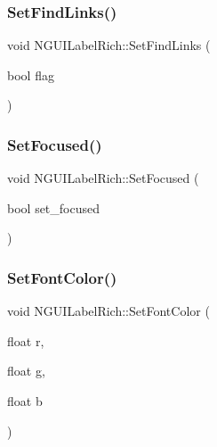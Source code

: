 \hypertarget{class_n_g_u_i_label_rich_a4e90829a193b725164089554447eec05}{}\label{class_n_g_u_i_label_rich_a4e90829a193b725164089554447eec05} 
\subsubsection{\texorpdfstring{Set\+Find\+Links()}{SetFindLinks()}}
{\footnotesize\ttfamily void N\+G\+U\+I\+Label\+Rich\+::\+Set\+Find\+Links (\begin{DoxyParamCaption}\item[{bool}]{flag }\end{DoxyParamCaption})}

\hypertarget{class_n_g_u_i_label_rich_abc1e70db35932df65b20ff7460099b85}{}\label{class_n_g_u_i_label_rich_abc1e70db35932df65b20ff7460099b85} 
\subsubsection{\texorpdfstring{Set\+Focused()}{SetFocused()}}
{\footnotesize\ttfamily void N\+G\+U\+I\+Label\+Rich\+::\+Set\+Focused (\begin{DoxyParamCaption}\item[{bool}]{set\+\_\+focused }\end{DoxyParamCaption})}

\hypertarget{class_n_g_u_i_label_rich_aa2bb7a3cb108c0f7e7b3c21c0fdf5547}{}\label{class_n_g_u_i_label_rich_aa2bb7a3cb108c0f7e7b3c21c0fdf5547} 
\subsubsection{\texorpdfstring{Set\+Font\+Color()}{SetFontColor()}}
{\footnotesize\ttfamily void N\+G\+U\+I\+Label\+Rich\+::\+Set\+Font\+Color (\begin{DoxyParamCaption}\item[{float}]{r,  }\item[{float}]{g,  }\item[{float}]{b }\end{DoxyParamCaption})}

